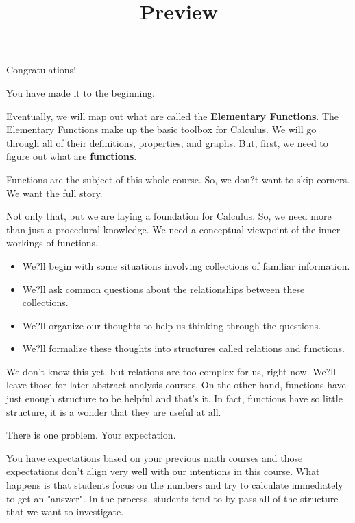 \documentclass{ximera}
\title{Preview}
\begin{document}
\begin{abstract}
\end{abstract}

\maketitle



Congratulations!  

You have made it to the beginning. 


Eventually, we will map out what are called the \textbf{Elementary Functions}.  The Elementary Functions make up the basic toolbox for Calculus. We will go through all of their definitions, properties, and graphs. But, first, we need to figure out what are \textbf{functions}.

Functions are the subject of this whole course.  So, we don?t want to skip corners.  We want the full story.  

Not only that, but we are laying a foundation for Calculus. So, we need more than just a procedural knowledge.  We need a conceptual viewpoint of the inner workings of functions.  

\begin{itemize}
\item We?ll begin with some situations involving collections of familiar information.  
\item We?ll ask common questions about the relationships between these collections.
\item We?ll organize our thoughts to help us thinking through the questions.
\item We?ll formalize these thoughts into structures called relations and functions.
\end{itemize}



We don't know this yet, but relations are too complex for us, right now. We?ll leave those for later abstract analysis courses. On the other hand, functions have just enough structure to be helpful and that's it.  In fact, functions have so little structure, it is a wonder that they are useful at all.

There is one problem.  Your expectation.

You have expectations based on your previous math courses and those expectations don't align very well with our intentions in this course.  What happens is that students focus on the numbers and try to calculate immediately to get an "answer".  In the process, students tend to by-pass all of the structure that we want to investigate. 
\end{document}
